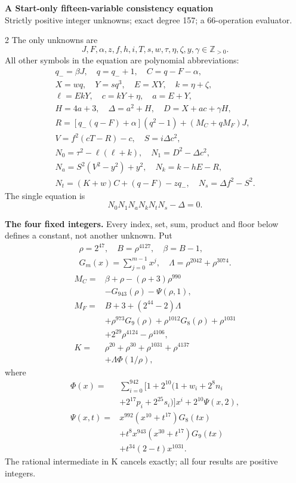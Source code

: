 \documentclass[10pt]{article}
\begin{document}
\begin{center}
{\large\bfseries A Start-only fifteen-variable consistency equation}\\[-1pt]
{\small Strictly positive integer unknowns; exact degree 157; a 66-operation evaluator.}
\end{center}\vspace{-8pt}
\begin{multicols}{2}
\fontsize{9}{9.5}\selectfont
The only unknowns are
\[
J,F,\alpha,z,f,h,i,T,s,w,\tau,\eta,\zeta,y,\gamma\in\mathbb Z_{>0}.
\]
All other symbols in the equation are polynomial abbreviations:
\[
\begin{gathered}
q_-=\beta J,\quad q=q_-+1,\quad C=q-F-\alpha,\\
X=wq,\quad Y=sq^3,\quad E=XY,\quad k=\eta+\zeta,\\
\ell=EkY,\quad c=kY+\eta,\quad a=E+Y,\\
H=4a+3,\quad\Delta=a^2+H,\quad D=X+ac+\gamma H,\\
R=[q_-(q-F)+\alpha](q^2-1)+(M_C+qM_F)J,\\
V=f^2(cT-R)-c,\quad S=i\Delta c^2,\\
N_0=\tau^2-\ell(\ell+k),\quad N_1=D^2-\Delta c^2,\\
N_a=S^2(V^2-y^2)+y^2,\quad N_k=k-hE-R,\\
N_t=(K+w)C+(q-F)-zq_-,\quad N_s=\Delta f^2-S^2.
\end{gathered}
\]
The single equation is
\[
\boxed{N_0N_1N_aN_kN_tN_s-\Delta=0.}
\]

\textbf{The four fixed integers.}
Every index, set, sum, product and floor below defines a constant, not
another unknown. Put
\[
\begin{gathered}
\rho=2^{47},\quad B=\rho^{4127},\quad\beta=B-1,\\
G_m(x)=\sum_{j=0}^{m-1}x^j,\quad
\Lambda=\rho^{2042}+\rho^{3074}.
\end{gathered}
\]
\begin{align*}
M_C={}&\beta+\rho-(\rho+3)\rho^{990}\\
&-G_{943}(\rho)-\Psi(\rho,1),\\
M_F={}&B+3+(2^{44}-2)\Lambda\\
&+\rho^{973}G_9(\rho)+\rho^{1012}G_8(\rho)
  +\rho^{1031}\\
&+2^{29}\rho^{4124}-\rho^{4106},\\
K={}&\rho^{20}+\rho^{30}+\rho^{1031}+\rho^{4137}\\
&+\Lambda\Phi(1/\rho),
\end{align*}
where
\[
\begin{split}
\Phi(x)={}&\sum_{i=0}^{942}[1+2^{10}(1+w_i+2^8n_i\\
&+2^{17}p_i+2^{25}s_i)]x^i+2^{10}\Psi(x,2),\\
\Psi(x,t)={}&x^{992}(x^{10}+t^{17})G_8(tx)\\
&+t^8x^{943}(x^{30}+t^{17})G_9(tx)\\
&+t^{34}(2-t)x^{1031}.
\end{split}
\]
The rational intermediate in K cancels exactly; all four results are positive integers.


\end{multicols}
\end{document}
